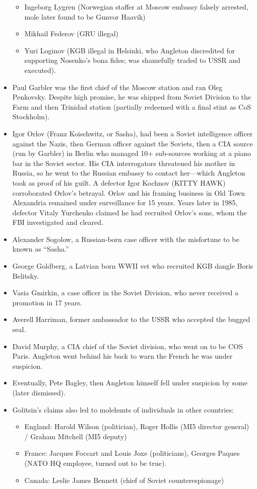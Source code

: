 \documentclass[
]{article}
\begin{document}
\begin{itemize}
  \begin{itemize}
  \item
    Ingeborg Lygren (Norwegian staffer at Moscow embassy falsely
    arrested, mole later found to be Gunvor Haavik)
  \item
    Mikhail Federov (GRU illegal)
  \item
    Yuri Loginov (KGB illegal in Helsinki, who Angleton discredited for
    supporting Nosenko's bona fides; was shamefully traded to USSR and
    executed).
  \end{itemize}
\item
  Paul Garbler was the first chief of the Moscow station and ran Oleg
  Penkovsky. Despite high promise, he was shipped from Soviet Division
  to the Farm and then Trinidad station (partially redeemed with a final
  stint as CoS Stockholm).
\item
  Igor Orlov (Franz Koischwitz, or Sasha), had been a Soviet
  intelligence officer against the Nazis, then German officer against
  the Soviets, then a CIA source (run by Garbler) in Berlin who managed
  10+ sub-sources working at a piano bar in the Soviet sector. His CIA
  interrogators threatened his mother in Russia, so he went to the
  Russian embassy to contact her---which Angleton took as proof of his
  guilt. A defector Igor Kochnov (KITTY HAWK) corroborated Orlov's
  betrayal. Orlov and his framing business in Old Town Alexandria
  remained under surveillance for 15 years. Years later in 1985,
  defector Vitaly Yurchenko claimed he had recruited Orlov's sons, whom
  the FBI investigated and cleared.
\item
  Alexander Sogolow, a Russian-born case officer with the misfortune to
  be known as ``Sasha.''
\item
  George Goldberg, a Latvian born WWII vet who recruited KGB dangle
  Boris Belitsky.
\item
  Vasia Gmirkin, a case officer in the Soviet Division, who never
  received a promotion in 17 years.
\item
  Averell Harriman, former ambassador to the USSR who accepted the
  bugged seal.
\item
  David Murphy, a CIA chief of the Soviet division, who went on to be
  COS Paris. Angleton went behind his back to warn the French he was
  under suspicion.
\item
  Eventually, Pete Bagley, then Angleton himself fell under suspicion by
  some (later dismissed).
\item
  Golitsin's claims also led to molehunts of individuals in other
  countries:

  \begin{itemize}
  \item
    England: Harold Wilson (politician), Roger Hollis (MI5 director
    general) / Graham Mitchell (MI5 deputy)
  \item
    France: Jacques Foccart and Louis Joxe (politicians), Georges Paques
    (NATO HQ employee, turned out to be true).
  \item
    Canada: Leslie James Bennett (chief of Soviet counterespionage)
  \end{itemize}
\end{itemize}
\end{document}

